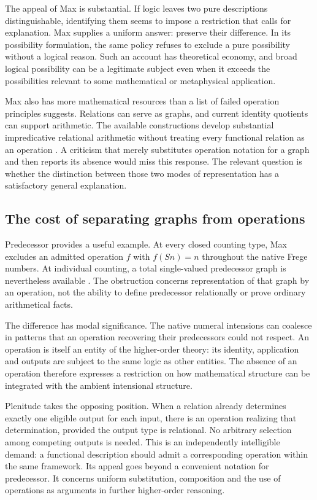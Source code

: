 \documentclass[12pt,letterpaper]{article}
\begin{document}
The appeal of Max is substantial. If logic leaves two pure descriptions distinguishable, identifying them seems to impose a restriction that calls for explanation. Max supplies a uniform answer: preserve their difference. In its possibility formulation, the same policy refuses to exclude a pure possibility without a logical reason. Such an account has theoretical economy, and broad logical possibility can be a legitimate subject even when it exceeds the possibilities relevant to some mathematical or metaphysical application.

Max also has more mathematical resources than a list of failed operation principles suggests. Relations can serve as graphs, and current identity quotients can support arithmetic. The available constructions develop substantial impredicative relational arithmetic without treating every functional relation as an operation \citep[\S29]{coding}. A criticism that merely substitutes operation notation for a graph and then reports its absence would miss this response. The relevant question is whether the distinction between those two modes of representation has a satisfactory general explanation.

\subsection{The cost of separating graphs from operations}

Predecessor provides a useful example. At every closed counting type, Max excludes an admitted operation $f$ with $f(Sn)=n$ throughout the native Frege numbers. At individual counting, a total single-valued predecessor graph is nevertheless available \citep{predecessor}. The obstruction concerns representation of that graph by an operation, not the ability to define predecessor relationally or prove ordinary arithmetical facts.

The difference has modal significance. The native numeral intensions can coalesce in patterns that an operation recovering their predecessors could not respect. An operation is itself an entity of the higher-order theory: its identity, application and outputs are subject to the same logic as other entities. The absence of an operation therefore expresses a restriction on how mathematical structure can be integrated with the ambient intensional structure.

Plenitude takes the opposing position. When a relation already determines exactly one eligible output for each input, there is an operation realizing that determination, provided the output type is relational. No arbitrary selection among competing outputs is needed. This is an independently intelligible demand: a functional description should admit a corresponding operation within the same framework. Its appeal goes beyond a convenient notation for predecessor. It concerns uniform substitution, composition and the use of operations as arguments in further higher-order reasoning.
\end{document}
